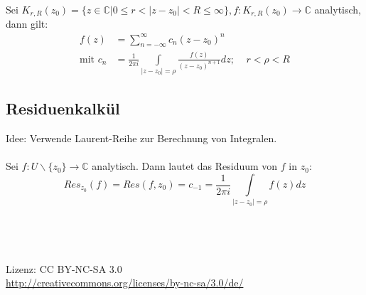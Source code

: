 \documentclass[a4paper,twocolumn,10pt]{article}
\begin{document}
Sei $K_{r,R}(z_0)=\{z\in\mathbb{C}|0\leq r<|z-z_0|<R\leq\infty\},f:K_{r,R}(z_0)\rightarrow\mathbb{C}$ analytisch, dann gilt:
\begin{equation*}
\begin{split}
f(z)&=\sum\limits_{n=-\infty}^{\infty}c_n(z-z_0)^n\\
\text{mit }c_n&=\frac{1}{2\pi i}\int\limits_{|z-z_0|=\rho}\frac{f(z)}{(z-z_0)^{n+1}}dz;\;\;\;\;r<\rho<R
\end{split}
\end{equation*}

\subsection{Residuenkalkül}
Idee: Verwende Laurent-Reihe zur Berechnung von Integralen.\\\\
Sei $f:U\backslash\{z_0\}\rightarrow\mathbb{C}$ analytisch. Dann lautet das Residuum von $f$ in $z_0$:
\begin{equation*}
Res_{z_0}(f)=Res(f,z_0)=c_{-1}=\frac{1}{2\pi i}\int\limits_{|z-z_0|=\rho}f(z)dz
\end{equation*}
\\\\\\\\
Lizenz: CC BY-NC-SA 3.0\\
\url{http://creativecommons.org/licenses/by-nc-sa/3.0/de/}
\end{document}

